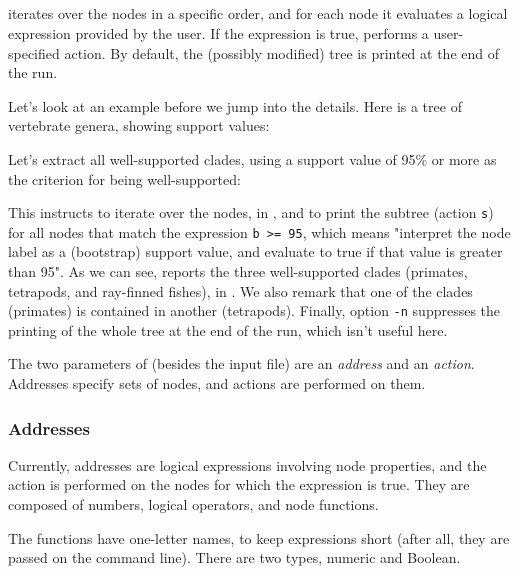\subsection{\ed}

\ed{} iterates over the nodes in a specific order, and for each node it
evaluates a logical expression provided by the user. If the expression is true,
\ed{} performs a user-specified action.  By default, the (possibly modified)
tree is printed at the end of the run.

Let's look at an example before we jump into the details. Here is a tree of vertebrate genera, showing support values:

\noindent{}Let's extract all well-supported clades, using a support value of 95\% or more as the criterion for being well-supported:


\begin{samepage}

\end{samepage}

\noindent{}This instructs \ed{} to iterate over the nodes, in \no{}, and to
print the subtree (action \texttt{s}) for all nodes that match the expression
\texttt{b >= 95}, which means "interpret the node label as a (bootstrap) support
value, and evaluate to true if that value is greater than 95". As we can see,
\ed{} reports the three well-supported clades (primates, tetrapods, and
ray-finned fishes), in \no. We also remark that one of the clades (primates) is
contained in another (tetrapods). Finally, option \texttt{-n} suppresses
the printing of the whole tree at the end of the run, which isn't useful here.

The two parameters of \ed{} (besides the input file) are an \emph{address} and
an \emph{action}. Addresses specify sets of nodes, and actions are performed on
them. 

\subsubsection{Addresses}

Currently, addresses are logical expressions involving node properties, and the
action is performed on the nodes for which the expression is true. They are
composed of numbers, logical operators, and node functions.

The functions have one-letter names, to keep expressions short (after all, they are passed on the command line). There are two types, numeric and Boolean.

